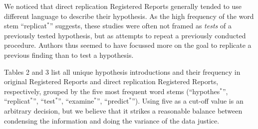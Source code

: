 \documentclass[british,,jou,floatsintext]{apa6}
\begin{document}
We noticed that direct replication Registered Reports generally tended to use different language to describe their hypothesis. As the high frequency of the word stem \enquote{replicat\(^\ast\)} suggests, these studies were often not framed as \emph{tests} of a previously tested hypothesis, but as attempts to repeat a previously conducted procedure.
Authors thus seemed to have focussed more on the goal to replicate a previous finding than to test a hypothesis.

Tables 2 and 3 list all unique hypothesis introductions and their frequency in original Registered Reports and direct replication Registered Reports, respectively, grouped by the five most frequent word stems (\enquote{hypothes\(^\ast\)}, \enquote{replicat\(^\ast\)}, \enquote{test\(^\ast\)}, \enquote{examine\(^\ast\)}, \enquote{predict\(^\ast\)}).
Using five as a cut-off value is an arbitrary decision, but we believe that it strikes a reasonable balance between condensing the information and doing the variance of the data justice.
\end{document}
